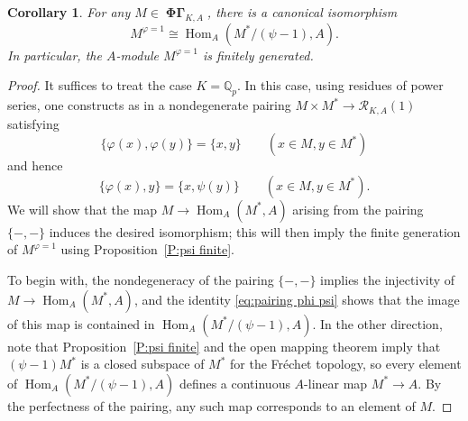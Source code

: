 \documentclass[12pt]{amsart}
\newtheorem{cor}[theorem]{Corollary}
\theoremstyle{definition}
\numberwithin{equation}{theorem}
\newcommand{\QQ}{\mathbb{Q}}
\newcommand{\calR}{\mathcal{R}}
\DeclareMathOperator{\Hom}{Hom}
\DeclareMathOperator{\PhiGamma}{\mathbf{\Phi \Gamma}}
\begin{document}
\begin{cor}
For any $M \in \PhiGamma_{K,A}$, there is a canonical isomorphism
\[
M^{\varphi=1} \cong \Hom_A(M^*/(\psi-1), A).
\]
In particular, the $A$-module $M^{\varphi=1}$ is finitely generated.
\end{cor}
\begin{proof}
It suffices to treat the case $K = \QQ_p$.
In this case, using residues of power series, one constructs as in \cite[Notation~2.3.13]{kpx} a nondegenerate pairing $M \times M^* \to \calR_{K,A}(1)$ satisfying
\[
\{\varphi(x), \varphi(y)\} = \{x, y\} \qquad (x \in M, y \in M^*)
\]
and hence
\begin{equation}
 \label{eq:pairing phi psi}
\{\varphi(x), y\}= \{x, \psi(y)\} \qquad (x \in M, y \in M^*).
\end{equation}
We will show that the map $M \to \Hom_A(M^*, A)$ arising from the pairing $\{-,-\}$ induces the desired isomorphism; this will then imply the finite generation of $M^{\varphi=1}$
using Proposition~\ref{P:psi finite}.

To begin with, the nondegeneracy of the pairing $\{-, -\}$ implies the injectivity of $M \to \Hom_A(M^*, A)$, and
the identity \eqref{eq:pairing phi psi} shows that the image of this map is contained in
$\Hom_A(M^*/(\psi-1), A)$. In the other direction, note that Proposition~\ref{P:psi finite} and the open mapping theorem imply that $(\psi-1)M^*$ is a closed subspace of $M^*$
for the Fr\'echet topology, so every element of $\Hom_A(M^*/(\psi-1), A)$ defines a continuous $A$-linear map $M^* \to A$. By the perfectness of the pairing,
any such map corresponds to an element of $M$.
\end{proof}
\end{document}
